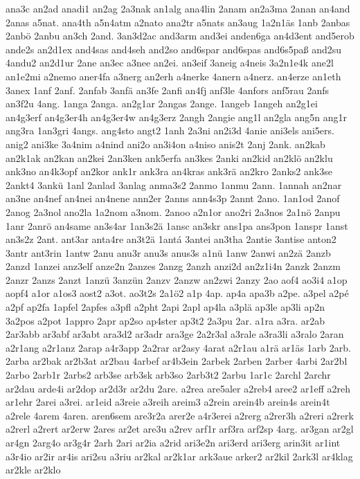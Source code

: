 {ana3c
an2ad
anadi1
an2ag
2a3nak
an1alg
ana4lin
2anam
an2a3ma
2anan
an4and
2anas
a5nat.
ana4th
a5n4atm
a2nato
ana2tr
a5nats
an3aug
1a2n1äs
1anb
2anbas
2anbö
2anbu
an3ch
2and.
3an3d2ac
and3arm
and3ei
anden6ga
an4d3ent
and5erob
ande2s
an2d1ex
and4sas
and4seh
and2so
and6spar
and6spas
and6s5paß
and2su
4andu2
an2d1ur
2ane
an3ec
a3nee
an2ei.
an3eif
3aneig
a4neis
3a2n1e4k
ane2l
an1e2mi
a2nemo
aner4fa
a3nerg
an2erh
a4nerke
4anern
a4nerz.
an4erze
an1eth
3anex
1anf
2anf.
2anfab
3anfä
an3fe
2anfi
an4fj
anf3le
4anfors
anf5rau
2anfs
an3f2u
4ang.
1anga
2anga.
an2g1ar
2angas
2ange.
1angeb
1angeh
an2g1ei
an4g3erf
an4g3er4h
an4g3er4w
an4g3erz
2angh
2angie
ang1l
an2gla
ang5n
ang1r
ang3ra
1an3gri
4angs.
ang4sto
angt2
1anh
2a3ni
an2i3d
4anie
ani3els
ani5ers.
anig2
ani3ke
3a4nim
a4nind
ani2o
an3i4on
a4niso
anis2t
2anj
2ank.
an2kab
an2k1ak
an2kan
an2kei
2an3ken
ank5erfa
an3kes
2anki
an2kid
an2klö
an2klu
ank3no
an4k3opf
an2kor
ank1r
ank3ra
an4kras
ank3rä
an2kro
2anks2
ank3se
2ankt4
3ankü
1anl
2anlad
3anlag
anma3s2
2anmo
1anmu
2ann.
1annah
an2nar
an3ne
an4nef
an4nei
an4nene
ann2er
2anns
ann4s3p
2annt
2ano.
1an1od
2anof
2anog
2a3nol
ano2la
1a2nom
a3nom.
2anoo
a2n1or
ano2ri
2a3nos
2a1nö
2anpu
1anr
2anrö
an4same
an3s4ar
1an3s2ä
1ansc
an3skr
ans1pa
ans3pon
1anspr
1anst
an3s2z
2ant.
ant3ar
anta4re
an3t2ä
1antá
3antei
an3tha
2antie
3antise
anton2
3antr
ant3rin
1antw
2anu
anu3r
anu3s
anus3s
a1nü
1anw
2anwi
an2zä
2anzb
2anzd
1anzei
anz3elf
anze2n
2anzes
2anzg
2anzh
anzi2d
an2z1i4n
2anzk
2anzm
2anzr
2anzs
2anzt
1anzü
3anzün
2anzv
2anzw
an2zwi
2anzy
2ao
aof4
ao3i4
a1op
aopf4
a1or
a1os3
aost2
a3ot.
ao3t2s
2a1ö2
a1p
4ap.
ap4a
apa3b
a2pe.
a3pel
a2pé
a2pf
ap2fa
1apfel
2apfes
a3pfl
a2pht
2api
2apl
ap4la
a3plä
ap3le
ap3li
ap2n
3a2pos
a2pot
1appro
2apr
ap2so
ap4ster
ap3t2
2a3pu
2ar.
a1ra
a3ra.
ar2ab
2ar3abb
ar3abf
ar3abt
ara3d2
ar3adr
ara3ge
2a2r3al
a3rale
a3ra3li
a3ralo
2aran
a2r1ang
a2r1anz
2arap
a4r3app
2a2rar
ar2asy
4arat
a2r1au
a1rä
ar1äs
1arb
2arb.
2arba
ar2bak
ar2b3at
ar2bau
4arbef
ar4b3ein
2arbek
2arben
2arber
4arbi
2ar2bl
2arbo
2arb1r
2arbs2
arb3se
arb3sk
arb3so
2arb3t2
2arbu
1ar1c
2archl
2archr
ar2dau
arde4i
ar2dop
ar2d3r
ar2du
2are.
a2rea
are5aler
a2reb4
aree2
ar1eff
a2reh
ar1ehr
2arei
a3rei.
ar1eid
a3reie
a3reih
areim3
a2rein
arein4b
arein4s
arein4t
a2rele
4arem
4aren.
aren6sem
are3r2a
arer2e
a4r3erei
a2rerg
a2rer3h
a2reri
a2rerk
a2rerl
a2rert
ar2erw
2ares
ar2et
are3u
a2rev
arf1r
arf3ra
arf2sp
4arg.
ar3gan
ar2gl
ar4gn
2arg4o
ar3g4r
2arh
2ari
ar2ia
a2rid
ari3e2n
ari3erd
ari3erg
arin3it
ar1int
a3r4io
ar2ir
ar4is
ari2su
a3riu
ar2kal
ar2k1ar
ark3aue
arker2
ar2kil
2ark3l
ar4klag
ar2kle
ar2klo
}
